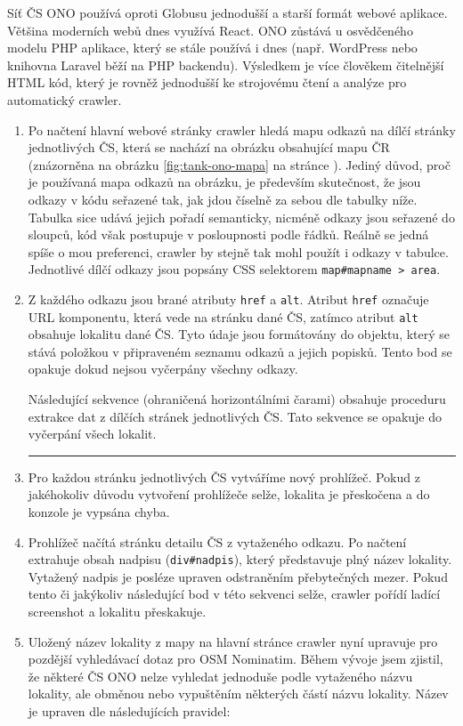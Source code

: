 Síť ČS ONO používá oproti Globusu jednodušší a starší formát webové aplikace.
Většina moderních webů dnes využívá React. ONO zůstává u osvědčeného modelu
PHP aplikace, který se stále používá i dnes (např. WordPress nebo knihovna
Laravel běží na PHP backendu). Výsledkem je více člověkem čitelnější HTML
kód, který je rovněž jednodušší ke strojovému čtení a analýze pro automatický
crawler.

\begin{enumerate}
    \item Po načtení hlavní webové stránky crawler hledá mapu odkazů
        na dílčí stránky jednotlivých ČS, která se nachází na obrázku
        obsahující mapu ČR (znázorněna na obrázku \ref{fig:tank-ono-mapa}
        na stránce \pageref{fig:tank-ono-mapa}). Jediný důvod, proč
        je používaná mapa odkazů na obrázku, je především skutečnost,
        že jsou odkazy v kódu seřazené tak, jak jdou číselně za sebou
        dle tabulky níže. Tabulka sice udává jejich pořadí semanticky,
        nicméně odkazy jsou seřazené do sloupců, kód však postupuje
        v posloupnosti podle řádků. Reálně se jedná spíše o mou preferenci,
        crawler by stejně tak mohl použít i odkazy v tabulce. Jednotlivé
        dílčí odkazy jsou popsány CSS selektorem
        \texttt{map\#mapname > area}.
    \item Z každého odkazu jsou brané atributy \texttt{href} a \texttt{alt}.
        Atribut \texttt{href} označuje URL komponentu, která vede na stránku
        dané ČS, zatímco atribut \texttt{alt} obsahuje lokalitu dané ČS.
        Tyto údaje jsou formátovány do objektu, který se stává položkou
        v připraveném seznamu odkazů a jejich popisků. Tento bod se opakuje
        dokud nejsou vyčerpány všechny odkazy.

        Následující sekvence (ohraničená horizontálními čarami) obsahuje
        proceduru extrakce dat z dílčích stránek jednotlivých ČS. Tato
        sekvence se opakuje do vyčerpání všech lokalit.
        \hrule
    \item Pro každou stránku jednotlivých ČS vytváříme nový prohlížeč.
        Pokud z jakéhokoliv důvodu vytvoření prohlížeče selže, lokalita
        je přeskočena a do konzole je vypsána chyba.
    \item Prohlížeč načítá stránku detailu ČS z vytaženého odkazu.
        Po načtení extrahuje obsah nadpisu (\texttt{div\#nadpis}), který
        představuje plný název lokality. Vytažený nadpis je posléze upraven
        odstraněním přebytečných mezer. Pokud tento či jakýkoliv následující
        bod v této sekvenci selže, crawler pořídí ladící screenshot
        a lokalitu přeskakuje.
    \item Uložený název lokality z mapy na hlavní stránce crawler
        nyní upravuje pro pozdější vyhledávací dotaz pro OSM Nominatim.
        Během vývoje jsem zjistil, že některé ČS ONO nelze vyhledat jednoduše
        podle vytaženého názvu lokality, ale obměnou nebo vypuštěním některých
        částí názvu lokality. Název je upraven dle následujících pravidel:
        

\end{enumerate}
